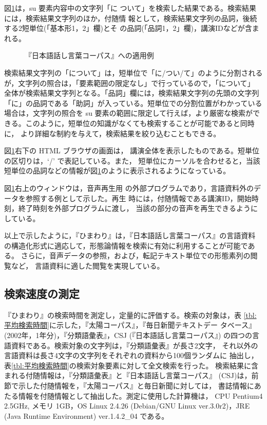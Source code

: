 \vspace{1zh}
図\ref{fig:適用例(日本語話し言葉コーパス)}は，su 要素内容中の文字列「に
ついて」を検索した結果である。検索結果には，検索結果文字列のほか，付随情
報として，検索結果文字列の品詞，後続する2短単位(「基本形1，2」欄)とそ
の品詞(「品詞1，2」欄)，講演IDなどが含まれる。


\begin{figure}[hbt]
 \begin{center}
  \epsfxsize=13.5cm
  \caption{『日本語話し言葉コーパス』への適用例}
  \label{fig:適用例(日本語話し言葉コーパス)}
 \end{center}   
\end{figure}


検索結果文字列の「について」は，短単位で「に/つい/て」のように分割される
が，文字列の照合は，「要素範囲の限定なし」で行っているので，「について」
全体が検索結果文字列となる。「品詞」欄には，検索結果文字列の先頭の文字列
「に」の品詞である「助詞」が入っている。短単位での分割位置がわかっている
場合は，文字列の照合を su 要素の範囲に限定して行えば，より厳密な検索がで
きる。このように，短単位の知識がなくても検索することが可能であると同時に，
より詳細な制約を与えて，検索結果を絞り込むこともできる。

図\ref{fig:適用例(日本語話し言葉コーパス)}右下の HTML ブラウザの画面は，
講演全体を表示したものである。短単位の区切りは，`/' で表記している。また，
短単位にカーソルを合わせると，当該短単位の品詞などの情報が図\ref{fig:適用例(日本語話し言葉コーパス)}のように表示されるようになっている。

図\ref{fig:適用例(日本語話し言葉コーパス)}右上のウィンドウは，音声再生用
の外部プログラムであり，言語資料外のデータを参照する例として示した。再生
時には，付随情報である講演ID，開始時刻，終了時刻を外部プログラムに渡し，
当該の部分の音声を再生できるようにしている。

以上で示したように，『ひまわり』は，『日本語話し言葉コーパス』の言語資料
の構造化形式に適応して，形態論情報を検索に有効に利用することが可能である。
さらに，音声データの参照，および，転記テキスト単位での形態素列の閲覧など，
言語資料に適した閲覧を実現している。

\subsection{検索速度の測定}
『ひまわり』の検索時間を測定し，定量的に評価する。検索の対象は，表
\ref{tbl:平均検索時間}に示した，『太陽コーパス』，『毎日新聞テキストデー
タベース』(2002年，1年分)，『分類語彙表』，CSJ (『日本語話し言葉コーパス』)
の四つの言語資料である。検索対象の文字列は，『分類語彙表』が長さ2文字，
それ以外の言語資料は長さ4文字の文字列をそれぞれの資料から100個ランダムに
抽出し，表\ref{tbl:平均検索時間}の検索対象要素に対して全文検索を行った。
検索結果に含まれる付随情報は，『分類語彙表』と『日本語話し言葉コーパス』
(CSJ)は，前節で示した付随情報を，『太陽コーパス』と毎日新聞に対しては，
書誌情報にあたる情報を付随情報として抽出した。測定に使用した計算機は，
CPU Pentium4 2.5GHz, メモリ 1GB，OS Linux 2.4.26 (Debian/GNU Linux
ver.3.0r2)，JRE (Java Runtime Environment) ver.1.4.2\_04 である。

